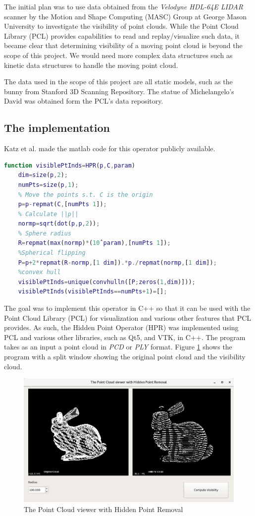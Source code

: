 \documentclass[11pt]{article}
\begin{document}
The initial plan was to use data obtained from the \textit{Velodyne HDL-64E LIDAR} scanner by the Motion and Shape Computing (MASC) Group at George Mason University to investigate the visibility of point clouds. While the Point Cloud Library (PCL) \cite{pcl} provides capabilities to read and replay/visualize such data, it became clear that determining visibility of a moving point cloud is beyond the scope of this project. We would need more complex data structures such as kinetic data structures to handle the moving point cloud. 

The data used in the scope of this project are all static models, such as the bunny from Stanford 3D Scanning Repository. The statue of Michelangelo's David was obtained form the PCL's data repository. 

\subsection{The implementation}

Katz et al. \cite{Katz07} made the matlab code for this operator publicly available.
\begin{lstlisting}[language=matlab, caption=Matlab code]
function visiblePtInds=HPR(p,C,param)
	dim=size(p,2);
	numPts=size(p,1);
	% Move the points s.t. C is the origin
	p=p-repmat(C,[numPts 1]);
	% Calculate ||p||
	normp=sqrt(dot(p,p,2));
	% Sphere radius
	R=repmat(max(normp)*(10ˆparam),[numPts 1]);
	%Spherical flipping
	P=p+2*repmat(R-normp,[1 dim]).*p./repmat(normp,[1 dim]);
	%convex hull
	visiblePtInds=unique(convhulln([P;zeros(1,dim)]));
	visiblePtInds(visiblePtInds==numPts+1)=[];
\end{lstlisting}

The goal was to implement this operator in C++ so that it can be used with the Point Cloud Library (PCL) for visualization and various other features that PCL provides. As such, the Hidden Point Operator (HPR) was implemented using PCL and various other libraries, such as Qt5, and VTK, in C++. The program  takes as an input a point cloud in \textit{PCD} or \textit{PLY} format. Figure \ref{fig:point_cloud_library_with_HPR} shows the program with a split window showing the original point cloud and the visibility cloud.

\begin{figure}[h]
\includegraphics[width=12cm]{point_cloud_library_with_HPR}
\centering
\caption{The Point Cloud viewer with Hidden Point Removal}
\label{fig:point_cloud_library_with_HPR}
\end{figure}
\end{document}
